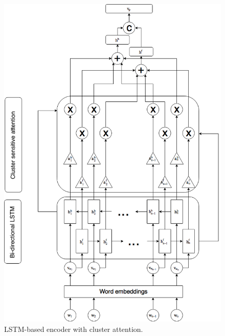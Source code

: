 \documentclass{bmcart}
\begin{document}
\begin{figure}[t!]
    \centering
    \captionsetup{justification=centering}
    \includegraphics[scale=0.3]{NN1.png}
    \caption{LSTM-based encoder with cluster attention.}
    \label{fig:RNNEncoders}
\end{figure}
\end{document}
